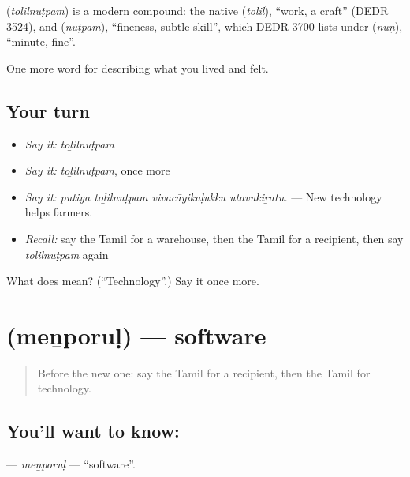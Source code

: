\begin{cousinweb}
\textbf{} (\emph{toḻilnuṭpam}) is a modern compound: the native  (\emph{toḻil}), \textquotedblleft{}work, a craft\textquotedblright{} (DEDR 3524), and  (\emph{nuṭpam}), \textquotedblleft{}fineness, subtle skill\textquotedblright{}, which DEDR 3700 lists under  (\emph{nuṇ}), \textquotedblleft{}minute, fine\textquotedblright{}.
\end{cousinweb}

\begin{grammarlens}[title={What you've built}]
One more word for describing what you lived and felt.
\end{grammarlens}

\subsection*{Your turn}
\begin{itemize}
\raggedright
  \item \emph{Say it:} \emph{toḻilnuṭpam}
  \item \emph{Say it:} \emph{toḻilnuṭpam}, once more
  \item \emph{Say it:} \emph{putiya toḻilnuṭpam vivacāyikaḷukku utavukiṟatu.} — New technology helps farmers.
  \item \emph{Recall:} say the Tamil for a warehouse, then the Tamil for a recipient, then say \emph{toḻilnuṭpam} again
\end{itemize}

\begin{tcolorbox}[breakable,colback=teal!4,colframe=teal!35!black,title={Before you move on}]
What does  mean? (\textquotedblleft{}Technology\textquotedblright{}.) Say it once more.
\end{tcolorbox}
\section[\texorpdfstring{\ta{மென்பொருள்} (meṉporuḷ)}{மென்பொருள் (meṉporuḷ)}]{ (meṉporuḷ) — software}

\label{lesson:TA-C515-menporul}



\begin{quote}
Before the new one: say the Tamil for a recipient, then the Tamil for technology.
\end{quote}

\subsection*{You'll want to know: }
\textbf{} — \emph{meṉporuḷ} — \textquotedblleft{}software\textquotedblright{}.

